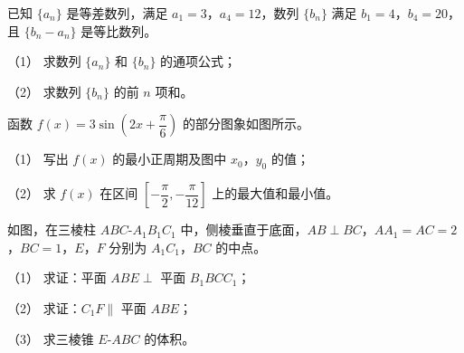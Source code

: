 \begin{question}
已知 $\{a_n\}$ 是等差数列，满足 $a_1=3$，$a_4=12$，数列 $\{b_n\}$ 满足 $b_1=4$，$b_4=20$，且 $\{b_n-a_n\}$ 是等比数列。

（1） 求数列 $\{a_n\}$ 和 $\{b_n\}$ 的通项公式；

（2） 求数列 $\{b_n\}$ 的前 $n$ 项和。

\Needspace{0.4\textheight}
\end{question}
\begin{question}
函数 $f(x)=3\sin\left(2x+\dfrac\pi6\right)$ 的部分图象如图所示。
\nopagebreak[4]
\begin{center}\end{center}
\nopagebreak[4]
（1） 写出 $f(x)$ 的最小正周期及图中 $x_0$，$y_0$ 的值；

（2） 求 $f(x)$ 在区间 $\left[-\dfrac\pi2,-\dfrac\pi{12}\right]$ 上的最大值和最小值。

\Needspace{0.4\textheight}
\end{question}
\begin{question}
如图，在三棱柱 $ABC\text{-}A_1B_1C_1$ 中，侧棱垂直于底面，$AB\perp BC$，$AA_1=AC=2$，$BC=1$，$E$，$F$ 分别为 $A_1C_1$，$BC$ 的中点。
\nopagebreak[4]
\begin{center}\end{center}
\nopagebreak[4]
（1） 求证：平面 $ABE\perp$ 平面 $B_1BCC_1$；

（2） 求证：$C_1F\parallel$ 平面 $ABE$；

（3） 求三棱锥 $E\text{-}ABC$ 的体积。

\Needspace{0.4\textheight}
\end{question}
